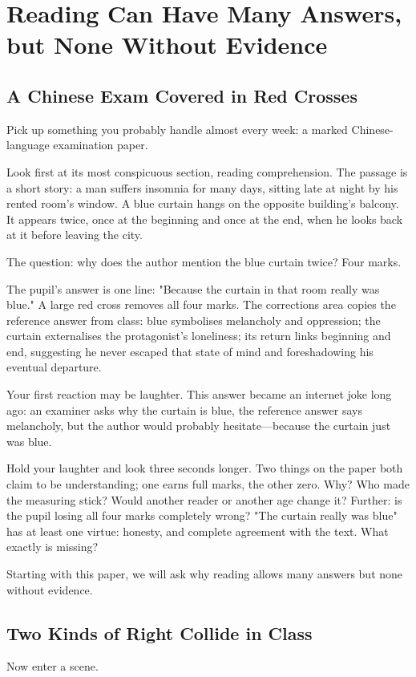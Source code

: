 \chapter[Many Readings, but Evidence Required]{Reading Can Have Many Answers, but None Without Evidence}
\section{A Chinese Exam Covered in Red Crosses}
Pick up something you probably handle almost every week: a marked Chinese-language examination paper.

Look first at its most conspicuous section, reading comprehension. The passage is a short story: a man suffers insomnia for many days, sitting late at night by his rented room's window. A blue curtain hangs on the opposite building's balcony. It appears twice, once at the beginning and once at the end, when he looks back at it before leaving the city.

The question: why does the author mention the blue curtain twice? Four marks.

The pupil's answer is one line: "Because the curtain in that room really was blue." A large red cross removes all four marks. The corrections area copies the reference answer from class: blue symbolises melancholy and oppression; the curtain externalises the protagonist's loneliness; its return links beginning and end, suggesting he never escaped that state of mind and foreshadowing his eventual departure.

Your first reaction may be laughter. This answer became an internet joke long ago: an examiner asks why the curtain is blue, the reference answer says melancholy, but the author would probably hesitate---because the curtain just was blue.

Hold your laughter and look three seconds longer. Two things on the paper both claim to be understanding; one earns full marks, the other zero. Why? Who made the measuring stick? Would another reader or another age change it? Further: is the pupil losing all four marks completely wrong? "The curtain really was blue" has at least one virtue: honesty, and complete agreement with the text. What exactly is missing?

Starting with this paper, we will ask why reading allows many answers but none without evidence.

\section{Two Kinds of Right Collide in Class}
Now enter a scene.

